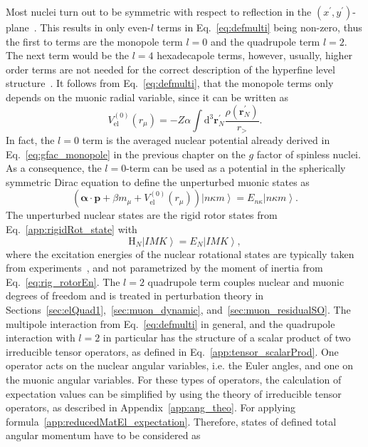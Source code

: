 Most nuclei turn out to be symmetric with respect to reflection in the $(x^\prime ,y^\prime)$-plane~\cite{zickendraht1991}. This results in only even-$l$ terms in Eq.~\eqref{eq:defmulti} being non-zero, thus the first to terms are the monopole term $l=0$ and the quadrupole term $l=2$. The next term would be the $l=4$ hexadecapole terms, however, usually, higher order terms are not needed for the correct description of the hyperfine level structure~\cite{BorieRinker1982}. It follows from Eq.~\eqref{eq:defmulti}, that the monopole terms only depends on the muonic radial variable, since it can be written as
\begin{equation}
V_{\text{el}}^{(0)}(r_\mu)=-Z\alpha \int\text{d}^3\mathbf{r}_N^\prime \frac{\rho(\mathbf{r}_N^\prime)}{r_>}.
\end{equation}
In fact, the $l=0$ term is the averaged nuclear potential already derived in Eq.~\eqref{eq:gfac_monopole} in the previous chapter on the $g$ factor of spinless nuclei. As a consequence, the $l=0$-term can be used as a potential in the spherically symmetric Dirac equation to define the unperturbed muonic states as
\begin{equation}
\label{eq:muonicEn}
\left(\boldsymbol{\alpha} \cdot \mathbf{p} + \beta m_\mu + V_{\text{el}}^{(0)}(r_\mu) \right) \left|n\kappa m\right> = E_{n\kappa}\left|n\kappa m\right>.
\end{equation}
The unperturbed nuclear states are the rigid rotor states from Eq.~\eqref{app:rigidRot_state} with
\begin{equation}
\label{eq:nuclEn}
\text{H}_N \left|IMK\right> = E_N \left|IMK\right>,
\end{equation}
where the excitation energies of the nuclear rotational states are typically taken from experiments~\cite{ENSDF}, and not parametrized by the moment of inertia from Eq.~\eqref{eq:rig_rotorEn}.
The $l=2$ quadrupole term couples nuclear and muonic degrees of freedom and is treated in perturbation theory in Sections~\ref{sec:elQuad1},~\ref{sec:muon_dynamic}, and~\ref{sec:muon_residualSO}. The multipole interaction from Eq.~\eqref{eq:defmulti} in general, and the quadrupole interaction with $l=2$ in particular has the structure of a scalar product of two irreducible tensor operators, as defined in Eq.~\eqref{app:tensor_scalarProd}. One operator acts on the nuclear angular variables, i.e. the Euler angles, and one on the muonic angular variables.
For these types of operators, the calculation of expectation values can be simplified by using the theory of irreducible tensor operators, as described in Appendix~\ref{app:ang_theo}. For applying formula~\eqref{app:reducedMatEl_expectation}. Therefore, states of defined total angular momentum have to be considered as
